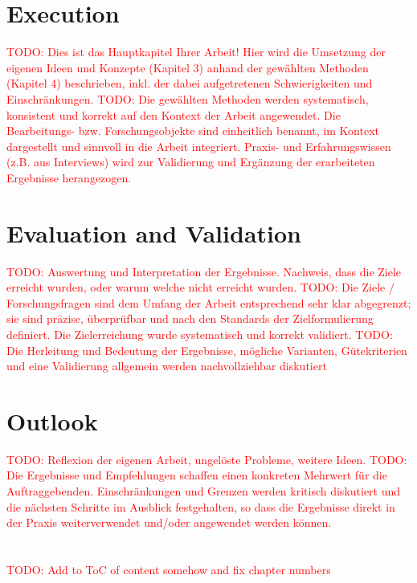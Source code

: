 \documentclass[a4paper,12pt,listof=numbered,toc=chapterentrywithdots]{scrreport}
\renewcommand{\todo}[1]{\textcolor{red}{TODO: #1}}
\begin{document}
	\chapter{Execution}
		\todo{Dies ist das Hauptkapitel Ihrer Arbeit! Hier wird die Umsetzung der eigenen Ideen und Konzepte (Kapitel 3) anhand der gewählten Methoden (Kapitel 4) beschrieben, inkl. der dabei aufgetretenen Schwierigkeiten und Einschränkungen.}
		\todo{Die gewählten Methoden werden systematisch, konsistent und korrekt auf den Kontext der Arbeit angewendet. Die Bearbeitungs- bzw. Forschungsobjekte sind einheitlich benannt, im Kontext dargestellt und sinnvoll in die Arbeit integriert. Praxis- und Erfahrungswissen (z.B. aus Interviews) wird zur Validierung und Ergänzung der erarbeiteten Ergebnisse herangezogen. }
	
	\chapter{Evaluation and Validation}
		\todo{Auswertung und Interpretation der Ergebnisse. Nachweis, dass die Ziele erreicht wurden, oder warum	welche nicht erreicht wurden.}
		\todo{Die Ziele / Forschungsfragen sind dem Umfang der Arbeit entsprechend sehr klar abgegrenzt; sie sind präzise, überprüfbar und nach den Standards der Zielformulierung definiert. Die Zielerreichung wurde systematisch und korrekt validiert.}
		\todo{Die Herleitung und Bedeutung der Ergebnisse, mögliche Varianten, Gütekriterien und eine Validierung allgemein werden nachvollziehbar diskutiert}
	
	\chapter{Outlook}
		\todo{Reflexion der eigenen Arbeit, ungelöste Probleme, weitere Ideen.}
		\todo{Die Ergebnisse und Empfehlungen schaffen einen konkreten Mehrwert für die Auftraggebenden. Einschränkungen und Grenzen werden kritisch diskutiert und die nächsten Schritte im Ausblick festgehalten, so dass die Ergebnisse direkt in der Praxis weiterverwendet und/oder angewendet werden können.}
	
	\chapter{\glossaryname}
	\printglossary[title={}]


	\todo{Add to ToC of content somehow and fix chapter numbers}
	

	\listoffigures
	
\end{document}
